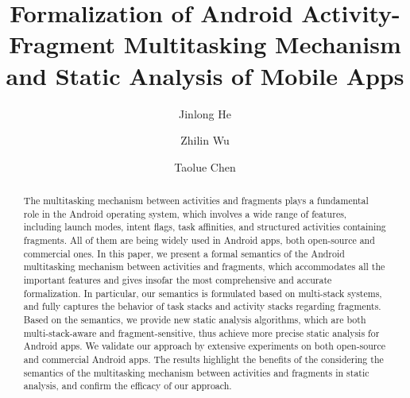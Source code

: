 \documentclass[acmsmall,manuscript,screen,review]{acmart}
\begin{document}
 
\title{Formalization of Android Activity-Fragment Multitasking Mechanism and Static Analysis of Mobile Apps}

\author{Jinlong He}

\author{Zhilin Wu}

\author{Taolue Chen}

\renewcommand{\shortauthors}{He et al.}

 
\begin{abstract}
The multitasking mechanism between activities and fragments plays a fundamental role in the Android operating system, which involves a wide range of features, including launch modes, intent flags, task affinities, and structured activities containing fragments. All of them are being widely used in Android apps, both open-source and commercial ones. In this paper, we present a formal semantics of the Android multitasking mechanism  between activities and fragments, which accommodates all the important features and gives insofar the most comprehensive and accurate formalization. In particular, our semantics is formulated based on multi-stack systems, and fully captures the behavior of task stacks and activity stacks regarding fragments. Based on the semantics, we provide new static analysis algorithms, which are both multi-stack-aware and fragment-sensitive, thus achieve more precise static analysis for Android apps. We validate our approach by extensive experiments on both open-source and commercial Android apps. The results highlight the benefits of the considering the semantics of the multitasking mechanism between activities and fragments in static analysis, and confirm the efficacy of our approach.
\end{abstract}
\end{document}
